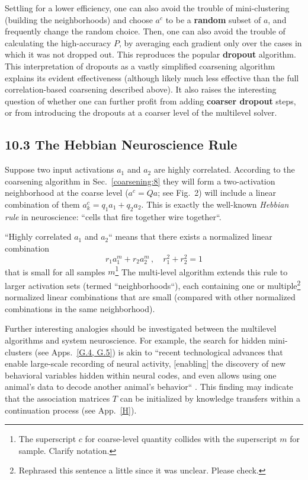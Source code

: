 \documentclass{article} %
\begin{document}
Settling for a lower efficiency, one can also avoid the trouble of mini-clustering (building the neighborhoods) and choose $a^c$ to be a \textbf{random} subset of $a$, and frequently change the random choice. Then, one can also avoid the trouble of calculating the high-accuracy $P$, by averaging each gradient only over the cases in which it was not dropped out. This reproduces the popular \textbf{dropout} algorithm. This interpretation of dropouts as a vastly simplified coarsening algorithm explains its evident effectiveness (although likely much less effective than the full correlation-based coarsening described above). It also raises the interesting question of whether one can further profit from adding \textbf{coarser dropout} steps, or from introducing the dropouts at a coarser level of the multilevel solver.

\subsection{10.3 The Hebbian Neuroscience Rule}
Suppose two input activations $a_1$ and $a_2$ are highly correlated. According to the coarsening algorithm in Sec.~\ref{coarsening:8} they will form a two-activation neighborhood at the coarse level ($a^c = Q a$; see Fig.~{2}) will include a linear combination of them $a^c_k = q_1 a_1 + q_2 a_2$. This is exactly the well-known {\it Hebbian rule} in neuroscience: ``cells that fire together wire together``.

``Highly correlated $a_1$ and $a_2$`` means that there exists a normalized linear combination
$$ r_1 a^m_1 + r_2 a^m_2\,, \quad r_1^2 + r_2^2 = 1 $$
that is small for all samples $m$\footnote{The superscript $c$ for coarse-level quantity collides with the superscript $m$ for sample. Clarify notation.} The multi-level algorithm extends this rule to larger activation sets (termed ``neighborhoods``), each containing one or multiple\footnote{Rephrased this sentence a little since it was unclear. Please check.} normalized linear combinations that are small (compared with other normalized combinations in the same neighborhood).

Further interesting analogies should be investigated between the multilevel algorithms and system neuroscience. For example, the search for hidden mini-clusters (see Apps.~\ref{G.4, G.5}) is akin to ``recent technological advances that enable large-scale recording of neural activity, [enabling] the discovery of new behavioral variables hidden within neural codes, and even allows using one animal's data to decode another animal's behavior`` \cite{18}. This finding may indicate that the association matrices $T$ can be initialized by knowledge transfers within a continuation process (see App.~\ref{H}).
\end{document}
